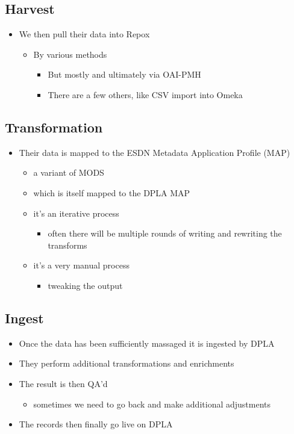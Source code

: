 \documentclass[11pt]{article}
\begin{document}
\subsection*{Harvest}
\label{sec:org643a4cf}
\begin{itemize}
\item We then pull their data into Repox
\begin{itemize}
\item By various methods
\begin{itemize}
\item But mostly and ultimately via OAI-PMH
\item There are a few others, like CSV import into Omeka
\end{itemize}
\end{itemize}
\end{itemize}

\subsection*{Transformation}
\label{sec:org0676c67}
\begin{itemize}
\item Their data is mapped to the ESDN Metadata Application Profile (MAP)
\begin{itemize}
\item a variant of MODS
\item which is itself mapped to the DPLA MAP
\item it's an iterative process
\begin{itemize}
\item often there will be multiple rounds of writing and rewriting the transforms
\end{itemize}
\item it's a very manual process
\begin{itemize}
\item tweaking the output
\end{itemize}
\end{itemize}
\end{itemize}

\subsection*{Ingest}
\label{sec:org326f34b}
\begin{itemize}
\item Once the data has been sufficiently massaged it is ingested by DPLA
\item They perform additional transformations and enrichments
\item The result is then QA'd
\begin{itemize}
\item sometimes we need to go back and make additional adjustments
\end{itemize}
\item The records then finally go live on DPLA
\end{itemize}
\end{document}

